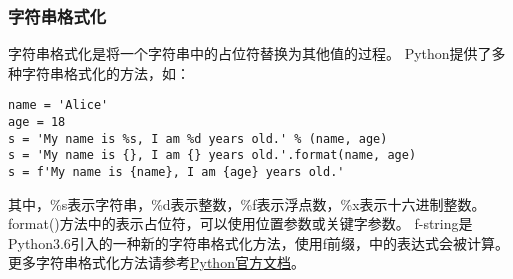 \documentclass[a4paper, 12pt]{article}
\begin{document}
        \subsubsection{字符串格式化}
            字符串格式化是将一个字符串中的占位符替换为其他值的过程。
            Python提供了多种字符串格式化的方法，如：\par
            \begin{listing}[h!]
                \centering
                \begin{verbatim}
name = 'Alice'
age = 18
s = 'My name is %s, I am %d years old.' % (name, age)
s = 'My name is {}, I am {} years old.'.format(name, age)
s = f'My name is {name}, I am {age} years old.'
                \end{verbatim}
            \end{listing}
            其中，\%s表示字符串，\%d表示整数，\%f表示浮点数，\%x表示十六进制整数。
            format()方法中的{}表示占位符，可以使用位置参数或关键字参数。
            f-string是Python3.6引入的一种新的字符串格式化方法，使用f前缀，{}中的表达式会被计算。
            更多字符串格式化方法请参考\href{https://docs.python.org/zh-cn/3/library/stdtypes.html#printf-style-string-formatting}{Python官方文档}。
\end{document}
